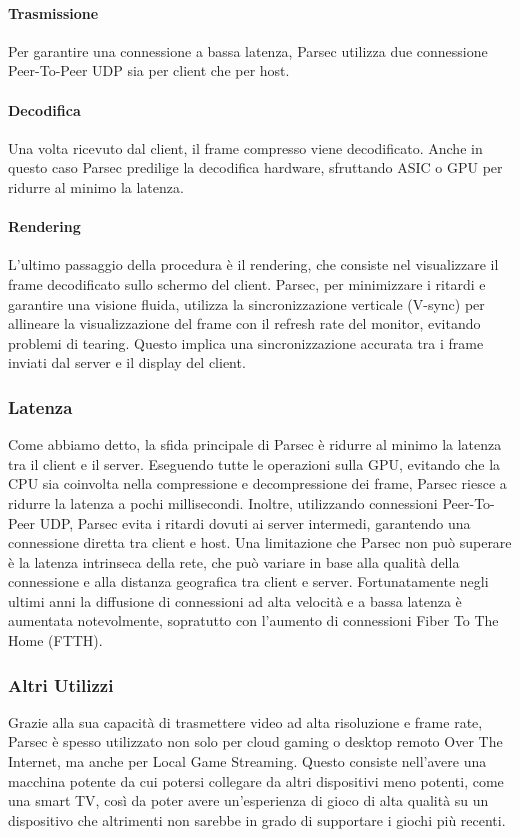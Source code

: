 \documentclass[12pt,a4paper,openright,twoside]{book}
\begin{document}
\paragraph{Trasmissione}
Per garantire una connessione a bassa latenza, Parsec utilizza due connessione Peer-To-Peer UDP sia per client che per host.

\paragraph{Decodifica}
Una volta ricevuto dal client, il frame compresso viene decodificato. Anche in questo caso Parsec predilige la decodifica hardware, sfruttando ASIC o GPU per ridurre al minimo la latenza.

\paragraph{Rendering}
L'ultimo passaggio della procedura è il rendering, che consiste nel visualizzare il frame decodificato sullo schermo del client. Parsec, per minimizzare i ritardi e garantire una visione fluida, utilizza la sincronizzazione verticale (V-sync) per allineare la visualizzazione del frame con il refresh rate del monitor, evitando problemi di tearing. Questo implica una sincronizzazione accurata tra i frame inviati dal server e il display del client.

\subsubsection{Latenza}
\label{sec:latenza-parsec}

Come abbiamo detto, la sfida principale di Parsec è ridurre al minimo la latenza tra il client e il server. Eseguendo tutte le operazioni sulla GPU, evitando che la CPU sia coinvolta nella compressione e decompressione dei frame, Parsec riesce a ridurre la latenza a pochi millisecondi. Inoltre, utilizzando connessioni Peer-To-Peer UDP, Parsec evita i ritardi dovuti ai server intermedi, garantendo una connessione diretta tra client e host. Una limitazione che Parsec non può superare è la latenza intrinseca della rete, che può variare in base alla qualità della connessione e alla distanza geografica tra client e server. Fortunatamente negli ultimi anni la diffusione di connessioni ad alta velocità e a bassa latenza è aumentata notevolmente, sopratutto con l'aumento di connessioni Fiber To The Home (FTTH).

\subsubsection{Altri Utilizzi}
Grazie alla sua capacità di trasmettere video ad alta risoluzione e frame rate, Parsec è spesso utilizzato non solo per cloud gaming o desktop remoto Over The Internet, ma anche per Local Game Streaming. Questo consiste nell'avere una macchina potente da cui potersi collegare da altri dispositivi meno potenti, come una smart TV, così da poter avere un'esperienza di gioco di alta qualità su un dispositivo che altrimenti non sarebbe in grado di supportare i giochi più recenti.
\end{document}
